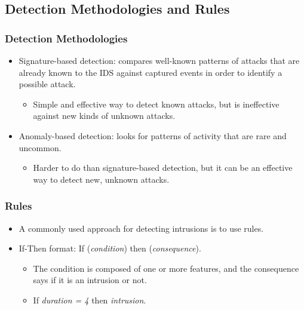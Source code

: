 \documentclass{beamer}
\newcommand{\linespace}{\vskip 0.25cm}
\begin{document}
\subsection{Detection Methodologies and Rules}
\begin{frame}
  \frametitle{Detection Methodologies}
  \begin{itemize}
  	\item Signature-based detection: compares well-known patterns of attacks
that are already known to the IDS against captured events in order to identify a possible attack.
	\begin{itemize}
		\item Simple and effective way to detect known attacks, but is ineffective against new kinds of unknown attacks.
	\end{itemize}

\linespace
\linespace

  	\item Anomaly-based detection: looks for patterns of activity that are rare and uncommon.
	\begin{itemize}
		\item Harder to do than signature-based detection, but it can be an effective way to detect new, unknown attacks.
	\end{itemize}
  \end{itemize}
\end{frame}


\begin{frame}
  \frametitle{Rules}
	\begin{itemize}
		\item A commonly used approach for detecting intrusions is to use rules.
		\item If-Then format: If (\emph{condition}) then (\emph{consequence}).
		\begin{itemize}
			\item The condition is composed of one or more features, and the consequence says if it is an intrusion or not.
			\item If \emph{duration = 4} then \emph{intrusion}.
		\end{itemize}				
	\end{itemize}
\end{frame}
\end{document}
